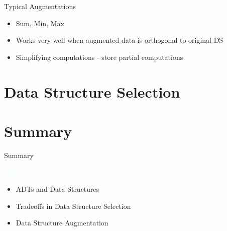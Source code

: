 \documentclass{beamer}
\newcommand{\tblue}[1]{{\Large {\textcolor{azure}{#1}}}}
\begin{document}
\begin{frame}{Typical Augmentations}
    \begin{itemize}
        \item Sum, Min, Max
        \item Works very well when augmented data is orthogonal to original DS
        \item Simplifying computations - store partial computations
    \end{itemize}
\end{frame}


\section{Data Structure Selection}




\section{Summary}

\begin{frame}{Summary}

\tblue{Major Concepts:}
\begin{itemize}
\item ADTs and Data Structures
\item Tradeoffs in Data Structure Selection
\item Data Structure Augmentation
\end{itemize}
\end{frame}
\end{document}
